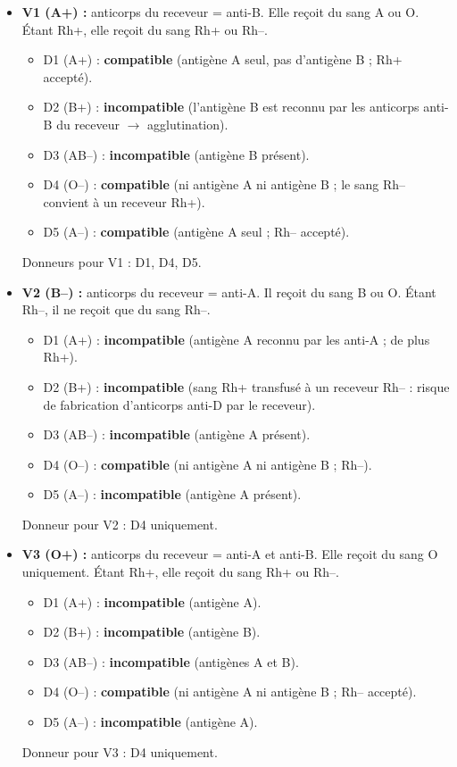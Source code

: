 \documentclass[11pt]{article}
\newcommand{\cle}[1]{{\popxbold\color{popdark}#1}}
\begin{document}
\begin{exoresolu}
\begin{itemize}
    \item \textbf{V1 (A+) :} anticorps du receveur = anti-B. Elle reçoit du sang A ou O. Étant Rh+, elle reçoit du sang Rh+ ou Rh–.
    \begin{itemize}
        \item D1 (A+) : \textbf{compatible} (antigène A seul, pas d'antigène B ; Rh+ accepté).
        \item D2 (B+) : \textbf{incompatible} (l'antigène B est reconnu par les anticorps anti-B du receveur $\rightarrow$ agglutination).
        \item D3 (AB–) : \textbf{incompatible} (antigène B présent).
        \item D4 (O–) : \textbf{compatible} (ni antigène A ni antigène B ; le sang Rh– convient à un receveur Rh+).
        \item D5 (A–) : \textbf{compatible} (antigène A seul ; Rh– accepté).
    \end{itemize}
    \cle{Donneurs pour V1 : D1, D4, D5.}

    \item \textbf{V2 (B–) :} anticorps du receveur = anti-A. Il reçoit du sang B ou O. Étant Rh–, il ne reçoit que du sang Rh–.
    \begin{itemize}
        \item D1 (A+) : \textbf{incompatible} (antigène A reconnu par les anti-A ; de plus Rh+).
        \item D2 (B+) : \textbf{incompatible} (sang Rh+ transfusé à un receveur Rh– : risque de fabrication d'anticorps anti-D par le receveur).
        \item D3 (AB–) : \textbf{incompatible} (antigène A présent).
        \item D4 (O–) : \textbf{compatible} (ni antigène A ni antigène B ; Rh–).
        \item D5 (A–) : \textbf{incompatible} (antigène A présent).
    \end{itemize}
    \cle{Donneur pour V2 : D4 uniquement.}

    \item \textbf{V3 (O+) :} anticorps du receveur = anti-A et anti-B. Elle reçoit du sang O uniquement. Étant Rh+, elle reçoit du sang Rh+ ou Rh–.
    \begin{itemize}
        \item D1 (A+) : \textbf{incompatible} (antigène A).
        \item D2 (B+) : \textbf{incompatible} (antigène B).
        \item D3 (AB–) : \textbf{incompatible} (antigènes A et B).
        \item D4 (O–) : \textbf{compatible} (ni antigène A ni antigène B ; Rh– accepté).
        \item D5 (A–) : \textbf{incompatible} (antigène A).
    \end{itemize}
    \cle{Donneur pour V3 : D4 uniquement.}
\end{itemize}


\end{exoresolu}
\end{document}
